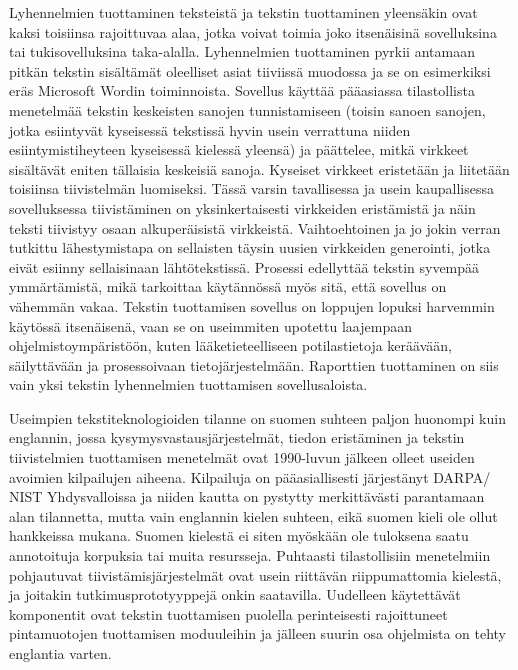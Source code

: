 \documentclass[]{../../metanetpaper}
\begin{document}
\begin{Parallel}[c]{77mm}{77mm}
{Lyhennelmien tuottaminen teksteistä ja tekstin tuottaminen yleensäkin
ovat kaksi toisiinsa rajoittuvaa alaa, jotka voivat toimia joko
itsenäisinä sovelluksina tai tukisovelluksina
taka-alalla. Lyhennelmien tuottaminen pyrkii antamaan pitkän tekstin
sisältämät oleelliset asiat tiiviissä muodossa ja se on esimerkiksi
eräs Microsoft Wordin toiminnoista. Sovellus käyttää pääasiassa
tilastollista menetelmää tekstin keskeisten sanojen tunnistamiseen
(toisin sanoen sanojen, jotka esiintyvät kyseisessä tekstissä hyvin
usein verrattuna niiden esiintymistiheyteen kyseisessä kielessä
yleensä) ja päättelee, mitkä virkkeet sisältävät eniten tällaisia
keskeisiä sanoja. Kyseiset virkkeet eristetään ja liitetään toisiinsa
tiivistelmän luomiseksi. Tässä varsin tavallisessa ja usein
kaupallisessa sovelluksessa tiivistäminen on yksinkertaisesti
virkkeiden eristämistä ja näin teksti tiivistyy osaan alkuperäisistä
virkkeistä. Vaihtoehtoinen ja jo jokin verran tutkittu lähestymistapa
on sellaisten täysin uusien virkkeiden generointi, jotka eivät esiinny
sellaisinaan lähtötekstissä. Prosessi edellyttää tekstin syvempää
ymmärtämistä, mikä tarkoittaa käytännössä myös sitä, että sovellus on
vähemmän vakaa. Tekstin tuottamisen sovellus on loppujen lopuksi
harvemmin käytössä itsenäisenä, vaan se on useimmiten upotettu
laajempaan ohjelmistoympäristöön, kuten lääketieteelliseen
potilastietoja keräävään, säilyttävään ja prosessoivaan
tietojärjestelmään. Raporttien tuottaminen on siis vain yksi tekstin
lyhennelmien tuottamisen sovellusaloista.

Useimpien tekstiteknologioiden tilanne on suomen suhteen paljon
huonompi kuin englannin, jossa kysymysvastausjärjestelmät, tiedon
eristäminen ja tekstin tiivistelmien tuottamisen menetelmät ovat
1990-luvun jälkeen olleet useiden avoimien kilpailujen
aiheena. Kilpailuja on pääasiallisesti järjestänyt DARPA/ NIST
Yhdysvalloissa ja niiden kautta on pystytty merkittävästi parantamaan
alan tilannetta, mutta vain englannin kielen suhteen, eikä suomen
kieli ole ollut hankkeissa mukana. Suomen kielestä ei siten myöskään
ole tuloksena saatu annotoituja korpuksia tai muita
resursseja. Puhtaasti tilastollisiin menetelmiin pohjautuvat
tiivistämisjärjestelmät ovat usein riittävän riippumattomia kielestä,
ja joitakin tutkimusprototyyppejä onkin saatavilla.  Uudelleen
käytettävät komponentit ovat tekstin tuottamisen puolella
perinteisesti rajoittuneet pintamuotojen tuottamisen moduuleihin ja
jälleen suurin osa ohjelmista on tehty englantia varten.
}

\end{Parallel}
\end{document}
